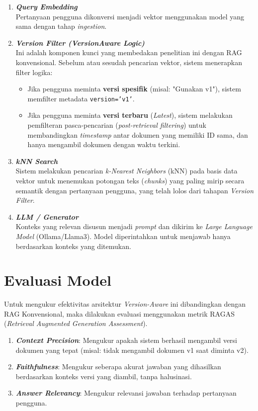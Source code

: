 \begin{enumerate}
    \item \textbf{\textit{Query Embedding}} \\
    Pertanyaan pengguna dikonversi menjadi vektor menggunakan model yang sama dengan tahap \textit{ingestion}.
    
    \item \textbf{\textit{Version Filter (VersionAware Logic)}} \\
    Ini adalah komponen kunci yang membedakan penelitian ini dengan RAG konvensional. Sebelum atau sesudah pencarian vektor, sistem menerapkan filter logika:
    \begin{itemize}
        \item Jika pengguna meminta \textbf{versi spesifik} (misal: "Gunakan v1"), sistem memfilter metadata \texttt{version='v1'}.
        \item Jika pengguna meminta \textbf{versi terbaru} (\textit{Latest}), sistem melakukan pemfilteran pasca-pencarian (\textit{post-retrieval filtering}) untuk membandingkan \textit{timestamp} antar dokumen yang memiliki ID sama, dan hanya mengambil dokumen dengan waktu terkini.
    \end{itemize}
    
    \item \textbf{\textit{kNN Search}} \\
    Sistem melakukan pencarian \textit{k-Nearest Neighbors} (kNN) pada basis data vektor untuk menemukan potongan teks (\textit{chunks}) yang paling mirip secara semantik dengan pertanyaan pengguna, yang telah lolos dari tahapan \textit{Version Filter}.
    
    \item \textbf{\textit{LLM / Generator}} \\
    Konteks yang relevan disusun menjadi \textit{prompt} dan dikirim ke \textit{Large Language Model} (Ollama/Llama3). Model diperintahkan untuk menjawab hanya berdasarkan konteks yang ditemukan.
\end{enumerate}

\section{Evaluasi Model}
Untuk mengukur efektivitas arsitektur \textit{Version-Aware} ini dibandingkan dengan RAG Konvensional, maka dilakukan evaluasi menggunakan metrik RAGAS (\textit{Retrieval Augmented Generation Assessment}).

\begin{enumerate}
    \item \textbf{\textit{Context Precision}}: Mengukur apakah sistem berhasil mengambil versi dokumen yang tepat (misal: tidak mengambil dokumen v1 saat diminta v2).
    \item \textbf{\textit{Faithfulness}}: Mengukur seberapa akurat jawaban yang dihasilkan berdasarkan konteks versi yang diambil, tanpa halusinasi.
    \item \textbf{\textit{Answer Relevancy}}: Mengukur relevansi jawaban terhadap pertanyaan pengguna.
\end{enumerate}
